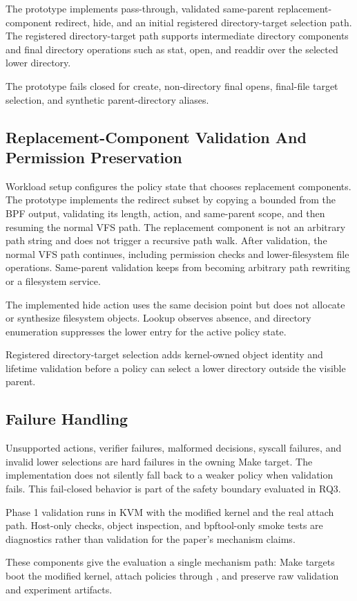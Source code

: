 The prototype implements pass-through, validated same-parent
replacement-component redirect, hide, and an initial registered directory-target
selection path. The registered directory-target path supports intermediate directory
components and final directory operations such as stat, 
open, and readdir over the selected lower directory.

The prototype fails closed for create, non-directory final opens, final-file
target selection, and synthetic parent-directory aliases.

\subsection{Replacement-Component Validation And Permission Preservation}

Workload setup configures the policy state that chooses replacement components.
The prototype implements the redirect subset by copying a bounded
 from the BPF output, validating its length, action, and
same-parent scope, and then resuming the normal VFS path. The replacement
component is not an
arbitrary path string and does not trigger a recursive path walk. After
validation, the normal VFS path continues, including permission checks and
lower-filesystem file operations. Same-parent validation keeps \namei from
becoming arbitrary path rewriting or a filesystem service.

The implemented hide action uses the same decision point but does not allocate
or synthesize filesystem objects. Lookup observes absence, and directory
enumeration suppresses the lower entry for the active policy state.

Registered directory-target selection adds kernel-owned object identity and lifetime
validation before a policy can select a lower directory outside the visible
parent.

\subsection{Failure Handling}

Unsupported actions, verifier failures, malformed decisions, syscall failures,
and invalid lower selections are hard failures in the owning Make target. The
implementation does not silently fall back to a weaker policy when validation
fails. This fail-closed behavior is part of the safety boundary evaluated in
RQ3.

Phase 1 validation runs in KVM with the modified kernel and the real
 attach path. Host-only checks, object inspection, and
bpftool-only smoke tests are diagnostics rather than validation for the paper's
mechanism claims.

These components give the evaluation a single mechanism path: Make targets boot
the modified kernel, attach policies through , and
preserve raw validation and experiment artifacts.
